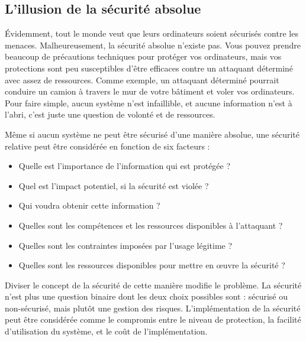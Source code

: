    \subsection{L'illusion de la sécurité absolue}
    Évidemment, tout le monde veut que leurs ordinateurs soient sécurisés contre les menaces. Malheureusement, 
    la sécurité absolue n'existe pas. Vous pouvez prendre beaucoup de précautions techniques pour protéger vos 
    ordinateurs, mais vos protections sont peu susceptibles d'être efficaces contre un attaquant déterminé avec
    assez de ressources. Comme exemple, un attaquant déterminé pourrait conduire un camion à travers le 
    mur de votre bâtiment et voler vos ordinateurs. 
    Pour faire simple, aucun système n'est infaillible, et aucune information n'est à l'abri, c'est juste une
    question de volonté et de ressources. \cite{virus} %

    Même si aucun système ne peut être sécurisé d'une manière absolue, une sécurité relative peut être considérée
    en fonction de six facteurs : %
    \begin{itemize}%
        \item Quelle est l'importance de l'information qui est protégée ?
        \item Quel est l'impact potentiel, si la sécurité est violée ?
        \item Qui voudra obtenir cette information ?
        \item Quelles sont les compétences et les ressources disponibles à l'attaquant ?
        \item Quelles sont les contraintes imposées par l'usage légitime ?
        \item Quelles sont les ressources disponibles pour mettre en œuvre la sécurité ?
    \end{itemize} %

    Diviser le concept de la sécurité de cette manière modifie le problème. La sécurité n'est plus une question 
    binaire dont les deux choix possibles sont : sécurisé ou non-sécurisé, mais plutôt une gestion des risques.
    L'implémentation de la sécurité peut être considérée comme le compromis entre le niveau de protection, 
    la facilité d'utilisation du système, et le coût de l'implémentation. \cite{virus} %

